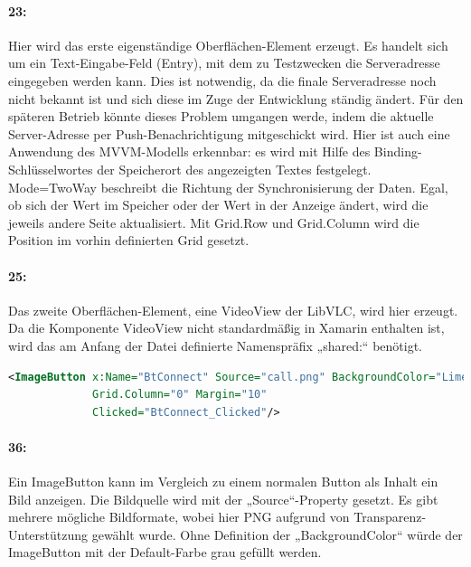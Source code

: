 \paragraph{23:} Hier wird das erste eigenständige Oberflächen-Element erzeugt. Es handelt sich um ein Text-Eingabe-Feld (Entry), mit dem zu Testzwecken die Serveradresse eingegeben werden kann. Dies ist notwendig, da die finale Serveradresse noch nicht bekannt ist und sich diese im Zuge der Entwicklung ständig ändert. Für den späteren Betrieb könnte dieses Problem umgangen werde, indem die aktuelle Server-Adresse per Push-Benachrichtigung mitgeschickt wird. Hier ist auch eine Anwendung des MVVM-Modells erkennbar: es wird mit Hilfe des Binding-Schlüsselwortes der Speicherort des angezeigten Textes festgelegt. Mode=TwoWay beschreibt die Richtung der Synchronisierung der Daten. Egal, ob sich der Wert im Speicher oder der Wert in der Anzeige ändert, wird die jeweils andere Seite aktualisiert. Mit Grid.Row und Grid.Column wird die Position im vorhin definierten Grid gesetzt.
\paragraph{25:} Das zweite Oberflächen-Element, eine VideoView der LibVLC, wird hier erzeugt. Da die Komponente VideoView nicht standardmäßig in Xamarin enthalten ist, wird das am Anfang der Datei definierte Namenspräfix „shared:“ benötigt.

\begin{lstlisting}[firstnumber=36,language=xml]
<ImageButton x:Name="BtConnect" Source="call.png" BackgroundColor="LimeGreen" Grid.Row="0"
             Grid.Column="0" Margin="10"
             Clicked="BtConnect_Clicked"/>
\end{lstlisting}
\paragraph{36:} Ein ImageButton kann im Vergleich zu einem normalen Button als Inhalt ein Bild anzeigen. Die Bildquelle wird mit der „Source“-Property gesetzt. Es gibt mehrere mögliche Bildformate, wobei hier PNG aufgrund von Transparenz-Unterstützung gewählt wurde. Ohne Definition der „BackgroundColor“ würde der ImageButton mit der Default-Farbe grau gefüllt werden.
